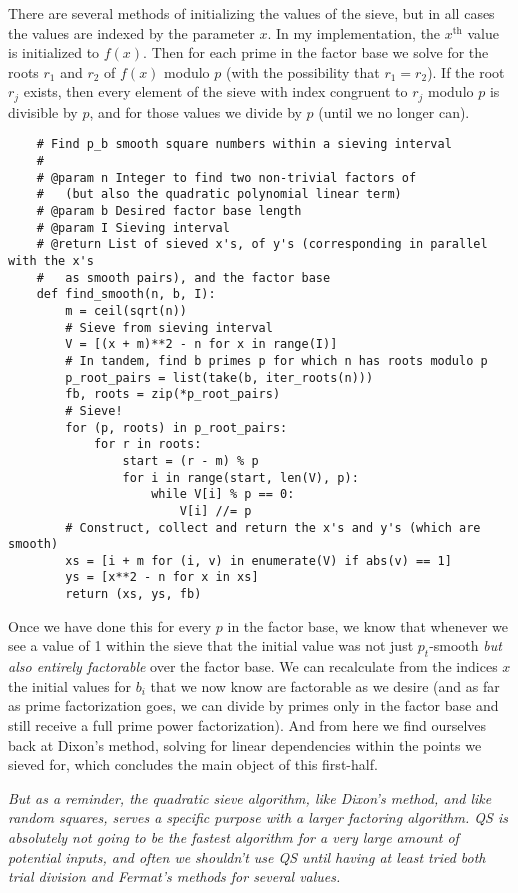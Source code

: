 \documentclass{report}
\begin{document}
There are several methods of initializing the values of the sieve, but in all cases the values are
indexed by the parameter $x$. In my implementation, the $x^\text{th}$ value is initialized
to $f(x)$. Then for each prime in the factor base we solve for the roots $r_1$ and $r_2$ of $f(x)$
modulo $p$ (with the possibility that $r_1=r_2$).
If the root $r_j$ exists, then every element of the sieve with index congruent to $r_j$ modulo $p$ is
divisible by $p$, and for those values we divide by $p$ (until we no longer can).
\begin{verbatim}
    # Find p_b smooth square numbers within a sieving interval
    #
    # @param n Integer to find two non-trivial factors of
    #   (but also the quadratic polynomial linear term)
    # @param b Desired factor base length
    # @param I Sieving interval
    # @return List of sieved x's, of y's (corresponding in parallel with the x's
    #   as smooth pairs), and the factor base
    def find_smooth(n, b, I):
        m = ceil(sqrt(n))
        # Sieve from sieving interval
        V = [(x + m)**2 - n for x in range(I)]
        # In tandem, find b primes p for which n has roots modulo p
        p_root_pairs = list(take(b, iter_roots(n)))
        fb, roots = zip(*p_root_pairs)
        # Sieve!
        for (p, roots) in p_root_pairs:
            for r in roots:
                start = (r - m) % p
                for i in range(start, len(V), p):
                    while V[i] % p == 0:
                        V[i] //= p
        # Construct, collect and return the x's and y's (which are smooth)
        xs = [i + m for (i, v) in enumerate(V) if abs(v) == 1]
        ys = [x**2 - n for x in xs]
        return (xs, ys, fb)
\end{verbatim}
Once we have done this for every $p$ in the factor base, we know that whenever we see a value of 1
within the sieve that the initial value was not just $p_t$-smooth \emph{but also entirely
factorable} over the factor base. We can recalculate from the indices $x$ the initial values for
$b_i$ that we now know are factorable as we desire (and as far as prime factorization goes, we can
divide by primes only in the factor base and still receive a full prime power factorization).
And from here we find ourselves back at Dixon's method, solving for linear dependencies within
the points we sieved for, which concludes the main object of this first-half.

\emph{
    But as a reminder, the quadratic sieve algorithm, like Dixon's method, and like random squares,
    serves a specific purpose with a larger factoring algorithm. QS is absolutely not going to be the
    fastest algorithm for a very large amount of potential inputs, and often we shouldn't use
    QS until having at least tried both trial division and Fermat's methods for several values.
}
\end{document}
